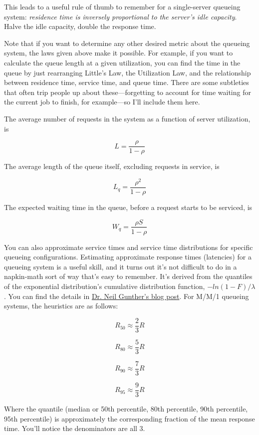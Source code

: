 \documentclass{vivid_layout}
\begin{document}
This leads to a useful rule of thumb to remember for a single-server queueing system: {\itshape residence time is inversely proportional to the server's idle capacity}. Halve the idle capacity, double the response time.

Note that if you want to determine any other desired metric about the queueing system, the laws given above make it possible. For example, if you want to calculate the queue length at a given utilization, you can find the time in the queue by just rearranging Little's Law, the Utilization Law, and the relationship between residence time, service time, and queue time. There are some subtleties that often trip people up about these---forgetting to account for time waiting for the current job to finish, for example---so I'll include them here.

The average number of requests in the system as a function of server utilization, is

\[
L = \frac{\rho}{1-\rho}
\]

The average length of the queue itself, excluding requests in service, is

\[
L_q = \frac{\rho^2}{1-\rho}
\]

The expected waiting time in the queue, before a request starts to be serviced,
is

\[
W_q = \frac{\rho S}{1 - \rho}
\]

You can also approximate service times and service time distributions for
specific queueing configurations. Estimating approximate response times
(latencies) for a queueing system is a useful skill, and it turns out it's not
difficult to do in a napkin-math sort of way that's easy to remember. It's
derived from the quantiles of the exponential distribution's cumulative
distribution function, $-ln(1-F)/\lambda$.
You can find the details in
\href{http://perfdynamics.blogspot.com/2013/12/response-time-percentiles-for-multi.html}{Dr. Neil Gunther's blog post}.
For M/M/1 queueing systems, the heuristics are as follows:

\[
R_{50} \approx \frac{2}{3} R
\]

\[
R_{80} \approx \frac{5}{3} R
\]

\[
R_{90} \approx \frac{7}{3} R
\]

\[
R_{95} \approx \frac{9}{3} R
\]

Where the quantile (median or 50th percentile, 80th percentile, 90th percentile,
95th percentile) is approximately the corresponding fraction of the
mean response time. You'll notice the denominators are all 3.
\end{document}
